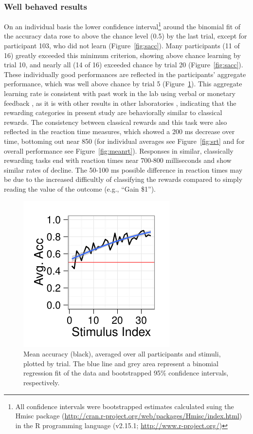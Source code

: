 \subsubsection{Well behaved results}
\label{subsub:wellbehaved}
On an individual basis the lower confidence interval\footnote{All confidence intervals were bootstrapped estimates calculated suing the Hmisc package (\url{http://cran.r-project.org/web/packages/Hmisc/index.html}) in the R programming language (v2.15.1; \url{http://www.r-project.org/})} around the binomial fit of the accuracy data rose to above the chance level (0.5) by the last trial, except for participant 103, who did not learn (Figure~\ref{fig:sacc}).  Many participants (11 of 16) greatly exceeded this minimum criterion, showing above chance learning by trial 10, and nearly all (14 of 16) exceeded chance by trial 20  (Figure~\ref{fig:sacc}).  These individually good performances are reflected in the participants' aggregate performance, which was well above chance by trial 5 (Figure~\ref{fig:meanacc}).  This aggregate learning rate is consistent with past work in the lab using verbal or monetary feedback \citep{Seger:2010p7188,Seger:2005pd}, as it is with other results in other laboratories \citep{ODoherty:2003p6329,Ramnani:2000p6515,Aron:2004p1375,Smith:2008p2803,Poldrack:2008p6839,Ashby:2006p9153,Ashby:2005p4764,Ashby:2005p9152}, indicating that the rewarding categories in present study are behaviorally similar to classical rewards.  The consistency between classical rewards and this task were also reflected in the reaction time measures, which showed a 200 ms decrease over time, bottoming out near 850 (for individual averages see Figure~\ref{fig:srt} and for overall performance see Figure~\ref{fig:meanrt}).  Responses in similar, classically rewarding tasks end with reaction times near 700-800 milliseconds and show similar rates of decline.  The 50-100 ms possible difference in reaction times may be due to the increased difficultly of classifying the rewards compared to simply reading the value of the outcome (e.g., ``Gain \$1'').

\begin{figure}[tp]
    \includegraphics{f_all_mean_acc}
    \centering
    \caption{Mean accuracy (black), averaged over all participants and stimuli, plotted by trial.  The blue line and grey area represent a binomial regression fit of the data and bootstrapped 95\% confidence intervals, respectively.}
    \label{fig:meanacc}
\end{figure}

